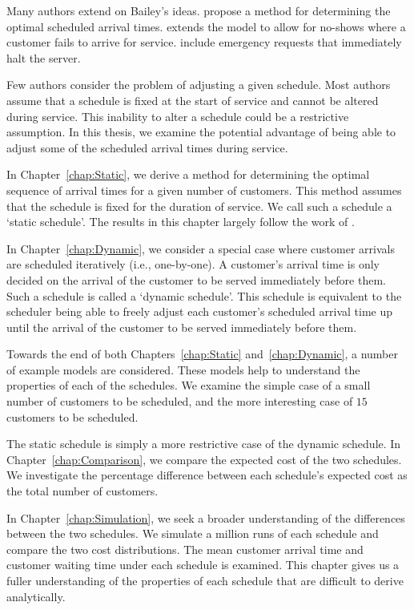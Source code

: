 Many authors extend on Bailey's ideas. \citet{Pegden} propose a method for determining the optimal scheduled arrival times. \citet{Mendel} extends the model to allow for no-shows where a customer fails to arrive for service. \citet{Fiems} include emergency requests that immediately halt the server.

Few authors consider the problem of adjusting a given schedule. Most authors assume that a schedule is fixed at the start of service and cannot be altered during service. This inability to alter a schedule could be a restrictive assumption. In this thesis, we examine the potential advantage of being able to adjust some of the scheduled arrival times during service.

In Chapter~\ref{chap:Static}, we derive a method for determining the optimal sequence of arrival times for a given number of customers. This method assumes that the schedule is fixed for the duration of service. We call such a schedule a `static schedule'. The results in this chapter largely follow the work of \citet{Pegden}.

In Chapter~\ref{chap:Dynamic}, we consider a special case where customer arrivals are scheduled iteratively (i.e., one-by-one). A customer's arrival time is only decided on the arrival of the customer to be served immediately before them. Such a schedule is called a `dynamic schedule'. This schedule is equivalent to the scheduler being able to freely adjust each customer's scheduled arrival time up until the arrival of the customer to be served immediately before them.

Towards the end of both Chapters~\ref{chap:Static} and~\ref{chap:Dynamic}, a number of example models are considered. These models help to understand the properties of each of the schedules. We examine the simple case of a small number of customers to be scheduled, and the more interesting case of $15$ customers to be scheduled.

The static schedule is simply a more restrictive case of the dynamic schedule. In Chapter~\ref{chap:Comparison}, we compare the expected cost of the two schedules. We investigate the percentage difference between each schedule's expected cost as the total number of customers.

In Chapter~\ref{chap:Simulation}, we seek a broader understanding of the differences between the two schedules. We simulate a million runs of each schedule and compare the two cost distributions. The mean customer arrival time and customer waiting time under each schedule is examined. This chapter gives us a fuller understanding of the properties of each schedule that are difficult to derive analytically.